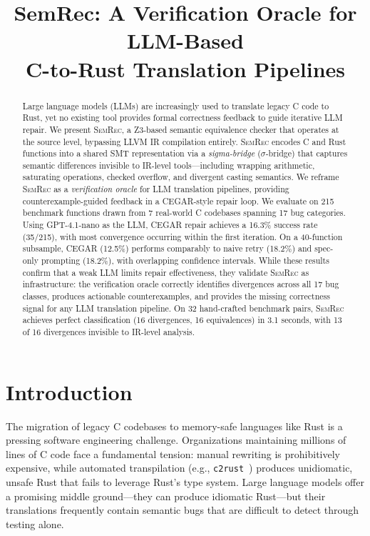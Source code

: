 \documentclass[10pt,letterpaper]{article}
\title{SemRec: A Verification Oracle for LLM-Based\\C-to-Rust Translation Pipelines}
\date{}
\begin{document}
\maketitle

\begin{abstract}
Large language models (LLMs) are increasingly used to translate legacy C code to Rust,
yet no existing tool provides formal correctness feedback to guide iterative LLM repair.
We present \textsc{SemRec}, a Z3-based semantic equivalence checker that operates at
the source level, bypassing LLVM IR compilation entirely. \textsc{SemRec} encodes
C and Rust functions into a shared SMT representation via a \emph{sigma-bridge}
($\sigma$-bridge) that captures semantic differences invisible to IR-level tools---including
wrapping arithmetic, saturating operations, checked overflow, and divergent casting semantics.
We reframe \textsc{SemRec} as a \emph{verification oracle} for LLM translation pipelines,
providing counterexample-guided feedback in a CEGAR-style repair loop.
We evaluate on 215 benchmark functions drawn from 7 real-world C codebases spanning 17
bug categories. Using GPT-4.1-nano as the LLM, CEGAR repair achieves a 16.3\% success
rate (35/215), with most convergence occurring within the first iteration. On a 40-function
subsample, CEGAR (12.5\%) performs comparably to naive retry (18.2\%) and spec-only
prompting (18.2\%), with overlapping confidence intervals. While these results confirm
that a weak LLM limits repair effectiveness, they validate \textsc{SemRec} as
infrastructure: the verification oracle correctly identifies divergences across all 17
bug classes, produces actionable counterexamples, and provides the missing correctness
signal for any LLM translation pipeline. On 32 hand-crafted benchmark pairs,
\textsc{SemRec} achieves perfect classification (16 divergences, 16 equivalences) in
3.1 seconds, with 13 of 16 divergences invisible to IR-level analysis.
\end{abstract}

\section{Introduction}
\label{sec:intro}

The migration of legacy C codebases to memory-safe languages like Rust is a pressing
software engineering challenge. Organizations maintaining millions of lines of C code
face a fundamental tension: manual rewriting is prohibitively expensive, while automated
transpilation (e.g., \texttt{c2rust}~\cite{c2rust}) produces unidiomatic, unsafe Rust that
fails to leverage Rust's type system. Large language models offer a promising middle
ground---they can produce idiomatic Rust---but their translations frequently contain
semantic bugs that are difficult to detect through testing alone.
\end{document}
